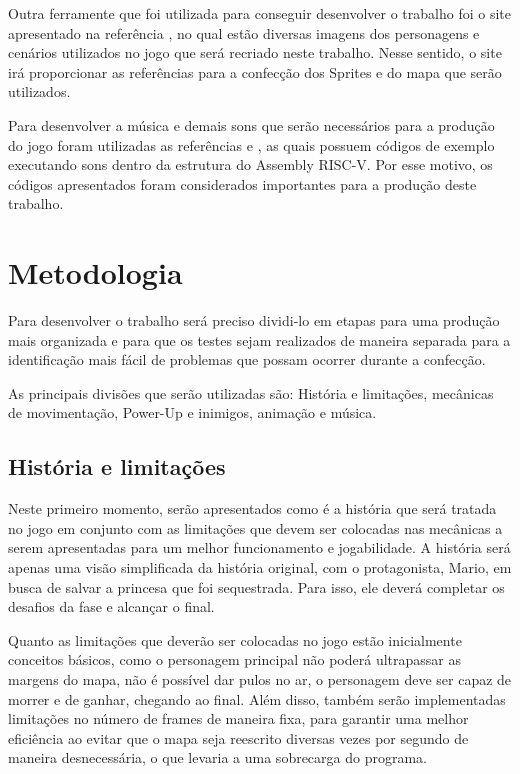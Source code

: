 \documentclass[11pt, twocolumn]{extarticle}
\begin{document}
Outra ferramente que foi utilizada para conseguir desenvolver o trabalho foi o site apresentado na referência \cite{Sprites}, no qual estão diversas imagens dos personagens e cenários utilizados no jogo que será recriado neste trabalho. Nesse sentido, o site irá proporcionar as referências para a confecção dos Sprites e do mapa que serão utilizados.

Para desenvolver a música e demais sons que serão necessários para a produção do jogo foram utilizadas as referências \cite{Pulsar} e \cite{Hooktheory}, as quais possuem códigos de exemplo executando sons dentro da estrutura do Assembly RISC-V. Por esse motivo, os códigos apresentados foram considerados importantes para a produção deste trabalho.

\section{Metodologia}
\indent \indent Para desenvolver o trabalho será preciso dividi-lo em etapas para uma produção mais organizada e para que os testes sejam realizados de maneira separada para a identificação mais fácil de problemas que possam ocorrer durante a confecção.

As principais divisões que serão utilizadas são: História e limitações, mecânicas de movimentação, Power-Up e inimigos, animação e música.

\subsection{História e limitações}
\indent \indent Neste primeiro momento, serão apresentados como é a história que será tratada no jogo em conjunto com as limitações que devem ser colocadas nas mecânicas a serem apresentadas para um melhor funcionamento e jogabilidade. A história será apenas uma visão simplificada da história original, com o protagonista, Mario, em busca de salvar a princesa que foi sequestrada. Para isso, ele deverá completar os desafios da fase e alcançar o final.

Quanto as limitações que deverão ser colocadas no jogo estão inicialmente conceitos básicos, como o personagem principal não poderá ultrapassar as margens do mapa, não é possível dar pulos no ar, o personagem deve ser capaz de morrer e de ganhar, chegando ao final. Além disso, também serão implementadas limitações no número de frames de maneira fixa, para garantir uma melhor eficiência ao evitar que o mapa seja reescrito diversas vezes por segundo de maneira desnecessária, o que levaria a uma sobrecarga do programa.
\end{document}
